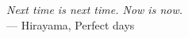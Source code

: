 \cleardoublepage
{}
\thispagestyle{empty}

\vspace*{3cm}

\begin{center}
    \textit{Next time is next time. Now is now.} \\ \medskip
    --- Hirayama, Perfect days
\end{center}

\medskip
